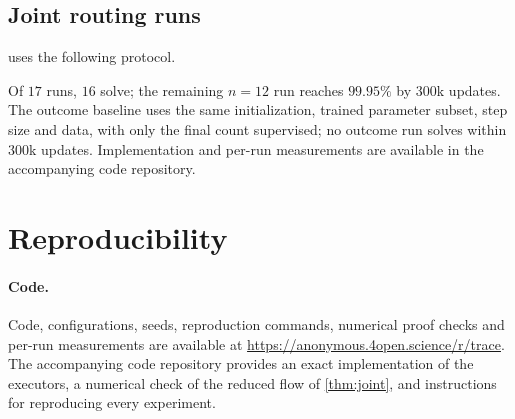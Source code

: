 \subsection{Joint routing runs}
\label{app:reach}

 uses the following protocol.
\begin{center}\small
{}
\end{center}
Of $17$ runs, $16$ solve; the remaining $n=12$ run reaches $99.95\%$ by $300$k updates. The outcome baseline uses the same
initialization, trained parameter subset, step size and data, with only the final count supervised; no outcome run
solves within $300$k updates. Implementation and per-run measurements are available in the accompanying code repository.

\section{Reproducibility}
\label{app:reproducibility}

\paragraph{Code.} Code, configurations, seeds, reproduction commands, numerical proof checks and per-run measurements are available at
\url{https://anonymous.4open.science/r/trace}. The accompanying code repository provides an exact implementation of the executors,
a numerical check of the reduced flow of \cref{thm:joint}, and instructions for reproducing every experiment.

